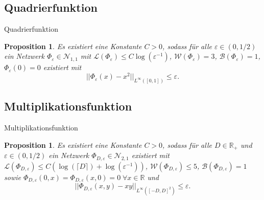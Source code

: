 \documentclass[10pt,aspectratio=169]{beamer}
\newtheorem{proposition}[theorem]{Proposition}
\newcommand{\R}{\mathbb{R}} %
\begin{document}
\subsection{Quadrierfunktion}

\begin{frame}{Quadrierfunktion}
    \begin{proposition} %
        Es existiert eine Konstante \(C>0\), sodass für alle \(\varepsilon \in (0,1/2)\) 
        ein Netzwerk \(\Phi_\varepsilon \in \mathcal{N}_{1,1}\) mit 
        \(\mathcal{L}(\Phi_\varepsilon) \leq C\log(\varepsilon^{-1})\), 
        \(\mathcal{W}(\Phi_\varepsilon) = 3\), \(\mathcal{B}(\Phi_\varepsilon) = 1\), 
        \(\Phi_\varepsilon(0) = 0\) existiert mit 
        \[ ||\Phi_\varepsilon(x) - x^2 ||_{L^\infty([0,1])} \leq \varepsilon. \]
    \end{proposition}
\end{frame}

\subsection{Multiplikationsfunktion}

\begin{frame}{Multiplikationsfunktion}
    \begin{proposition} %
        Es existiert eine Konstante \(C>0\), sodass für alle \(D\in \R_+\) und \(\varepsilon \in (0, 1/2)\) 
        ein Netzwerk \(\Phi_{D,\varepsilon} \in \mathcal{N}_{2,1}\) existiert mit 
        \(\mathcal{L}(\Phi_{D, \varepsilon}) \leq C (\log(\lceil D \rceil) + \log(\varepsilon^{-1})) \), 
        \(\mathcal{W}(\Phi_{D, \varepsilon}) \leq 5\), \(\mathcal{B}(\Phi_{D, \varepsilon}) = 1\) sowie 
        \(\Phi_{D,\varepsilon}(0,x) = \Phi_{D,\varepsilon}(x,0) = 0 \;\forall x\in \R\) und 
        \[ ||\Phi_{D,\varepsilon}(x,y) - xy||_{L^\infty([-D,D]^2)} \leq \varepsilon. \]
    \end{proposition}
\end{frame}
\end{document}
